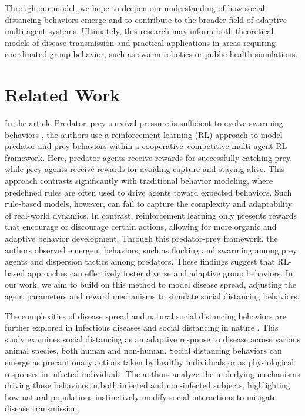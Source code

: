 \documentclass[9pt]{IEEEtran}
\begin{document}
Through our model, we hope to deepen our understanding of how social distancing behaviors emerge and to contribute to the broader field of adaptive multi-agent systems. Ultimately, this research may inform both theoretical models of disease transmission and practical applications in areas requiring coordinated group behavior, such as swarm robotics or public health simulations.

\section{Related Work}

In the article Predator–prey survival pressure is sufficient to evolve swarming behaviors \cite{li2023predator}, the authors use a reinforcement learning (RL) approach to model predator and prey behaviors within a cooperative–competitive multi-agent RL framework. Here, predator agents receive rewards for successfully catching prey, while prey agents receive rewards for avoiding capture and staying alive. This approach contrasts significantly with traditional behavior modeling, where predefined rules are often used to drive agents toward expected behaviors. Such rule-based models, however, can fail to capture the complexity and adaptability of real-world dynamics. In contrast, reinforcement learning only presents rewards that encourage or discourage certain actions, allowing for more organic and adaptive behavior development. Through this predator-prey framework, the authors observed emergent behaviors, such as flocking and swarming among prey agents and dispersion tactics among predators. These findings suggest that RL-based approaches can effectively foster diverse and adaptive group behaviors. In our work, we aim to build on this method to model disease spread, adjusting the agent parameters and reward mechanisms to simulate social distancing behaviors.

The complexities of disease spread and natural social distancing behaviors are further explored in Infectious diseases and social distancing in nature \cite{stockmaier2021infectious}. This study examines social distancing as an adaptive response to disease across various animal species, both human and non-human. Social distancing behaviors can emerge as precautionary actions taken by healthy individuals or as physiological responses in infected individuals. The authors analyze the underlying mechanisms driving these behaviors in both infected and non-infected subjects, highlighting how natural populations instinctively modify social interactions to mitigate disease transmission.
\end{document}
